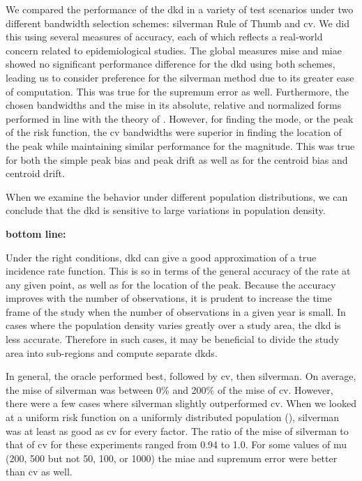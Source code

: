


We compared the performance of the \acrlong{dkd} in a variety of test scenarios
under two different bandwidth selection schemes:
\gls{silverman} Rule of Thumb and \acrlong{cv}.
We did this using several measures of accuracy,
each of which reflects a real-world concern related to epidemiological studies.
The global measures \gls{mise} and \gls{miae} showed no significant performance difference
for the \gls{dkd} using both schemes,
leading us to consider preference for the \gls{silverman} method due to its greater ease of computation.
This was true for the \gls{supremum error} as well.
Furthermore,
the chosen bandwidths and the \gls{mise} in its absolute,
relative and normalized forms performed in line with the theory of
.
However,
for finding the mode,
or the peak of the risk function,
the \gls{cv} bandwidths were superior in finding the location of the peak
while maintaining similar performance for the magnitude.
This was true for both the simple \gls{peak bias} and \gls{peak drift} as well as for the
\gls{centroid bias} and \gls{centroid drift}.

When we examine the behavior under different population distributions,
we can conclude that the \gls{dkd} is sensitive to large variations in population density.

\textbf{bottom line:}

Under the right conditions,
\gls{dkd} can give a good approximation of a true \gls{incidence rate} function.
This is so in terms of the general accuracy of the rate at any given point,
as well as for the location of the peak.
Because the accuracy improves with the number of observations,
it is prudent to increase the time frame of the study when the number of observations in a given year is small.
In cases where the population density varies greatly over a study area,
the \gls{dkd} is less accurate.
Therefore in such cases,
it may be beneficial to divide the study area into sub-regions and compute separate \glspl{dkd}.

In general, the \gls{oracle} performed best, followed by \gls{cv}, then \gls{silverman}.
On average, the \gls{mise} of \gls{silverman} was between 0\% and 200\% of the \gls{mise} of \gls{cv}.
However, there were a few cases where \gls{silverman} slightly outperformed \gls{cv}.
When we looked at a uniform risk function on a uniformly distributed population (), \gls{silverman} was at least as good as \gls{cv} for every \gls{factor}.
The ratio of the \gls{mise} of \gls{silverman} to that of \gls{cv} for these experiments ranged from 0.94 to 1.0.
For some values of \gls{mu} (200, 500 but not 50, 100, or 1000) the \gls{miae} and \gls{supremum error} were better than \gls{cv} as well.

